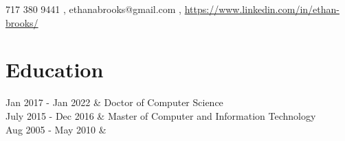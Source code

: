 \documentclass[]{resume}
\begin{document}
\pagestyle{empty} %

{\faMobile \hspace{\FAspace} 717 380 9441
	\sep
	\faEnvelope
	\hspace{\FAspace}
	ethanabrooks@gmail.com
	\sep
	\faLinkedinSquare
	\hspace{\FAspace}
	\url{https://www.linkedin.com/in/ethan-brooks/}
}

\section*{Education}
\begin{tabularcv}
	Jan 2017 - Jan 2022 & 
	{Doctor of Computer Science}
	\\[\vspacepar] %
	July 2015 - Dec 2016 & 
	{Master of Computer and Information Technology}
	\\[\vspacepar] %
	Aug 2005 - May 2010 & 
\end{tabularcv}
\end{document}
